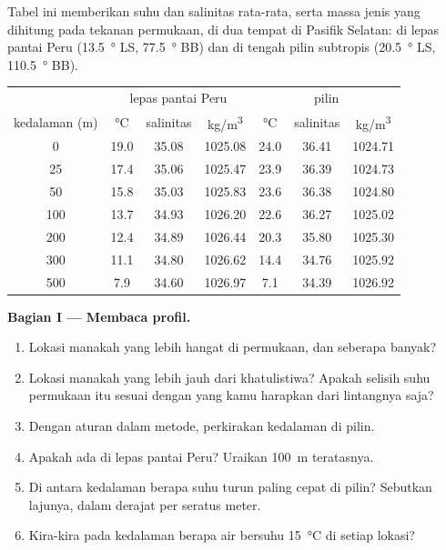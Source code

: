 \begin{problem}
\label{pb:g10:layered-ocean:1}
Tabel ini memberikan suhu dan salinitas rata-rata, serta massa jenis yang
dihitung pada tekanan permukaan, di dua tempat di Pasifik Selatan: di lepas
pantai Peru (\qty{13.5}{\degree} LS, \qty{77.5}{\degree} BB) dan di tengah
pilin subtropis (\qty{20.5}{\degree} LS, \qty{110.5}{\degree} BB).

\begin{center}
\small
\begin{tabular}{c|ccc|ccc}
\hline
 & \multicolumn{3}{c|}{lepas pantai Peru} & \multicolumn{3}{c}{pilin} \\
kedalaman (\unit{m}) & \unit{\degreeCelsius} & salinitas & \unit{kg/m^3} & \unit{\degreeCelsius} & salinitas & \unit{kg/m^3} \\
\hline
0 & 19.0 & 35.08 & 1025.08 & 24.0 & 36.41 & 1024.71 \\
25 & 17.4 & 35.06 & 1025.47 & 23.9 & 36.39 & 1024.73 \\
50 & 15.8 & 35.03 & 1025.83 & 23.6 & 36.38 & 1024.80 \\
100 & 13.7 & 34.93 & 1026.20 & 22.6 & 36.27 & 1025.02 \\
200 & 12.4 & 34.89 & 1026.44 & 20.3 & 35.80 & 1025.30 \\
300 & 11.1 & 34.80 & 1026.62 & 14.4 & 34.76 & 1025.92 \\
500 & 7.9 & 34.60 & 1026.97 & 7.1 & 34.39 & 1026.92 \\
\hline
\end{tabular}
\end{center}

\medskip
\noindent\textbf{Bagian I --- Membaca profil.}
\begin{enumerate}
  \item Lokasi manakah yang lebih hangat di permukaan, dan seberapa banyak?
  \item Lokasi manakah yang lebih jauh dari khatulistiwa? Apakah selisih suhu
        permukaan itu sesuai dengan yang kamu harapkan dari lintangnya saja?
  \item Dengan aturan dalam metode, perkirakan kedalaman 
        di pilin.
  \item Apakah ada  di lepas pantai Peru? Uraikan
        \qty{100}{m} teratasnya.
  \item Di antara kedalaman berapa suhu turun paling cepat di pilin?
        Sebutkan lajunya, dalam derajat per seratus meter.
  \item Kira-kira pada kedalaman berapa air bersuhu \qty{15}{\degreeCelsius}
        di setiap lokasi?
\end{enumerate}


\end{problem}
